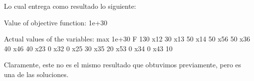 \documentclass[12pt,letterpaper]{article}
\begin{document}
Lo cual entrega como resultado lo siguiente:

\begin{verbatimtab}[4]
Value of objective function: 1e+30

Actual values of the variables:
max                         1e+30
F                             130
x12                            30
x13                            50
x14                            50
x56                            50
x36                            40
x46                            40
x23                             0
x32                             0
x25                            30
x35                            20
x53                             0
x34                             0
x43                            10
\end{verbatimtab}

Claramente, este no es el mismo resultado que obtuvimos previamente, pero es una de las soluciones.
\end{document}
